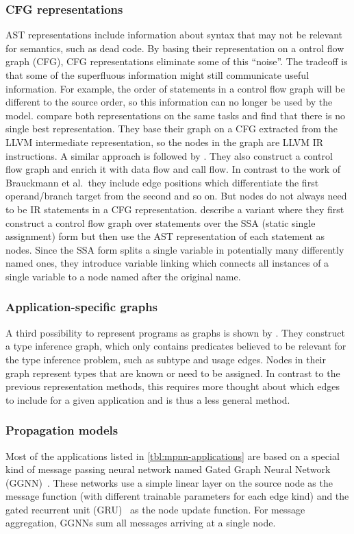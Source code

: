\documentclass[sigconf,authordraft=true,nonacm=true]{acmart}
\begin{document}
\subsubsection{CFG representations}
AST representations include information about syntax that may not be relevant for semantics, such as dead code.
By basing their representation on a ontrol flow graph (CFG), CFG representations eliminate some of this ``noise''.
The tradeoff is that some of the superfluous information might still communicate useful information.
For example, the order of statements in a control flow graph will be different to the source order, so this information can no longer be used by the model.
\citet{brauckmann_compiler-based_2020} compare both representations on the same tasks and find that there is no single best representation.
They base their graph on a CFG extracted from the LLVM intermediate representation, so the nodes in the graph are LLVM IR instructions.
A similar approach is followed by \citet{cummins_programl_2020}.
They also construct a control flow graph and enrich it with data flow and call flow.
In contrast to the work of Brauckmann et al.\, they include edge positions which differentiate the first operand/branch target from the second and so on.
But nodes do not always need to be IR statements in a CFG representation.
\citet{si_learning_2018} describe a variant where they first construct a control flow graph over statements over the SSA (static single assignment) form but then use the AST representation of each statement as nodes.
Since the SSA form splits a single variable in potentially many differently named ones, they introduce variable linking which connects all instances of a single variable to a node named after the original name.

\subsubsection{Application-specific graphs}
A third possibility to represent programs as graphs is shown by \citet{wei_lambdanet_2020}.
They construct a type inference graph, which only contains predicates believed to be relevant for the type inference problem, such as subtype and usage edges.
Nodes in their graph represent types that are known or need to be assigned.
In contrast to the previous representation methods, this requires more thought about which edges to include for a given application and is thus a less general method.

\subsubsection{Propagation models}
Most of the applications listed in \cref{tbl:mpnn-applications} are based on a special kind of message passing neural network named Gated Graph Neural Network (GGNN)~\cite{li_gated_2017}.
These networks use a simple linear layer on the source node as the message function (with different trainable parameters for each edge kind) and the gated recurrent unit (GRU)~\cite{cho_properties_2014} as the node update function.
For message aggregation, GGNNs sum all messages arriving at a single node.
\end{document}
